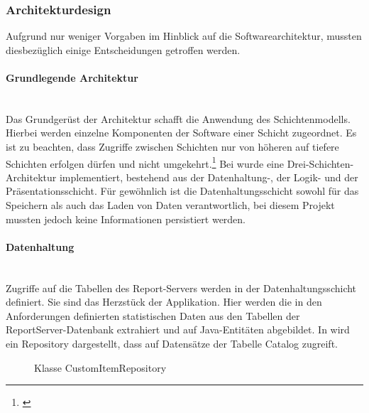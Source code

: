 \subsubsection{Architekturdesign}
\label{sec:Architekturdesign}
Aufgrund nur weniger Vorgaben im Hinblick auf die Softwarearchitektur, mussten diesbezüglich einige Entscheidungen getroffen werden.

\paragraph{Grundlegende Architektur} ~\\
\label{p:Architektur}
Das Grundgerüst der Architektur schafft die Anwendung des Schichtenmodells. Hierbei werden einzelne Komponenten der Software einer Schicht zugeordnet. Es ist zu beachten, dass Zugriffe zwischen Schichten nur von höheren auf tiefere Schichten erfolgen dürfen und nicht umgekehrt.\footnote{\Vgl \cite{wiki:arch}}
Bei \projektName wurde eine Drei-Schichten-Architektur implementiert, bestehend aus der Datenhaltung-, der Logik- und der Präsentationsschicht. Für gewöhnlich ist die Datenhaltungsschicht sowohl für das Speichern als auch das Laden von Daten verantwortlich, bei diesem Projekt mussten jedoch keine Informationen persistiert werden.

\paragraph{Datenhaltung} ~\\
\label{p:Datenhaltung}
Zugriffe auf die Tabellen des Report-Servers werden in der Datenhaltungsschicht definiert. Sie sind das Herzstück der Applikation. Hier werden die in den Anforderungen definierten statistischen Daten aus den Tabellen der ReportServer-Datenbank extrahiert und auf Java-Entitäten abgebildet. In  wird ein Repository dargestellt, dass auf Datensätze der Tabelle Catalog zugreift.
\begin{figure}[htb]
	\centering
	\caption{Klasse CustomItemRepository}
	\label{fig:CustomItemRepository}
\end{figure}

